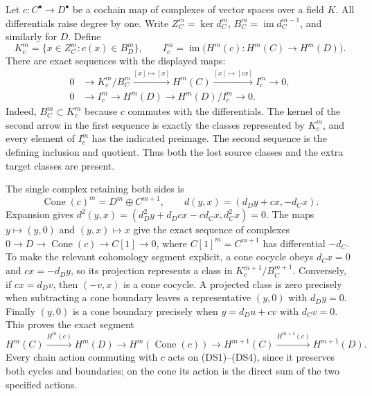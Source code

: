 \documentclass{article}
\begin{document}
Let $c:C^\bullet\to D^\bullet$ be a cochain map of complexes of vector
spaces over a field $K$.  All differentials raise degree by one.  Write
$Z_C^m=\ker d_C^m$, $B_C^m=\operatorname{im}d_C^{m-1}$, and similarly
for $D$.  Define
\[
 K_c^m=\{x\in Z_C^m:c(x)\in B_D^m\},\qquad
 I_c^m=\operatorname{im}\bigl(H^m(c):H^m(C)\to H^m(D)\bigr).
 \tag{DS1}
\]
There are exact sequences with the displayed maps:
\[
\begin{split}
0&\longrightarrow K_c^m/B_C^m
 \xrightarrow{[x]\mapsto[x]} H^m(C)
 \xrightarrow{[x]\mapsto[cx]} I_c^m\longrightarrow0,\\
0&\longrightarrow I_c^m\longrightarrow H^m(D)
 \longrightarrow H^m(D)/I_c^m\longrightarrow0.
\end{split}\tag{DS2}
\]
Indeed, $B_C^m\subset K_c^m$ because $c$ commutes with the differentials.
The kernel of the second arrow in the first sequence is exactly the
classes represented by $K_c^m$, and every element of $I_c^m$ has the
indicated preimage.  The second sequence is the defining inclusion and
quotient.  Thus both the lost source classes and the extra target classes
are present.

The single complex retaining both sides is
\[
 \operatorname{Cone}(c)^m=D^m\oplus C^{m+1},\qquad
 d(y,x)=(d_Dy+cx,-d_Cx).
 \tag{DS3}
\]
Expansion gives $d^2(y,x)=(d_D^2y+d_Dcx-cd_Cx,d_C^2x)=0$.
The maps $y\mapsto(y,0)$ and $(y,x)\mapsto x$ give the exact sequence
of complexes $0\to D\to\operatorname{Cone}(c)\to C[1]\to0$, where
$C[1]^m=C^{m+1}$ has differential $-d_C$.  To make the relevant
cohomology segment explicit, a cone cocycle obeys
$d_Cx=0$ and $cx=-d_Dy$, so its projection represents a class in
$K_c^{m+1}/B_C^{m+1}$.  Conversely, if $cx=d_Dv$, then $(-v,x)$
is a cone cocycle.  A projected class is zero precisely when subtracting
a cone boundary leaves a representative $(y,0)$ with $d_Dy=0$.
Finally $(y,0)$ is a cone boundary precisely when
$y=d_Du+cv$ with $d_Cv=0$.  This proves the exact segment
\[
 H^m(C)\xrightarrow{H^m(c)} H^m(D)
 \longrightarrow H^m(\operatorname{Cone}(c))
 \longrightarrow H^{m+1}(C)\xrightarrow{H^{m+1}(c)}H^{m+1}(D).
 \tag{DS4}
\]
Every chain action commuting with $c$ acts on (DS1)--(DS4), since it
preserves both cycles and boundaries; on the cone its action is the
direct sum of the two specified actions.
\end{document}
